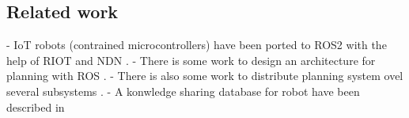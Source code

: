 \subsection{Related work}



 - IoT robots (contrained microcontrollers) \cite{EWSN-IoT-Robot} have been ported to ROS2 with the help of RIOT and NDN \cite{ACM-ICN-IoT-Robotics}.
 - There is some work to design an architecture for planning with ROS \cite{ROSPlan}.
 - There is also some work to distribute planning system ovel several subsystems \cite{NASA-europa-p2p}.
 - A konwledge sharing database for robot have been described in \cite{Roboearth}



